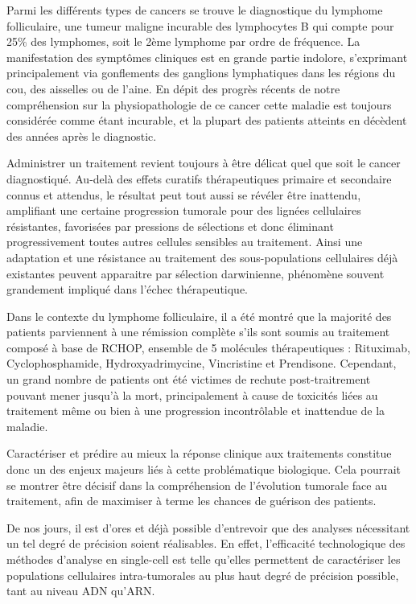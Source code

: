 \documentclass[12pt]{report}
\begin{document}
Parmi les différents types de cancers se trouve le diagnostique du lymphome folliculaire, une tumeur maligne incurable des lymphocytes B qui compte pour 25\% des lymphomes, soit le 2ème lymphome par ordre de fréquence. 
La manifestation des symptômes cliniques est en grande partie indolore, s'exprimant principalement via gonflements des ganglions lymphatiques dans les régions du cou, des aisselles ou de l’aine. 
En dépit des progrès récents de notre compréhension sur la physiopathologie de ce cancer\cite{huet} cette maladie est toujours considérée comme étant incurable, et la plupart des patients atteints en décèdent des années après le diagnostic. 

Administrer un traitement revient toujours à être délicat quel que soit le cancer diagnostiqué. 
Au-delà des effets curatifs thérapeutiques primaire et secondaire connus et attendus, le résultat peut tout aussi se révéler être inattendu, amplifiant une certaine progression tumorale pour des lignées cellulaires résistantes,
favorisées par pressions de sélections et donc éliminant progressivement toutes autres cellules sensibles au traitement\cite{Greaves}. 
Ainsi une adaptation et une résistance au traitement des sous-populations cellulaires déjà existantes peuvent apparaitre par sélection darwinienne, phénomène souvent grandement impliqué dans l’échec thérapeutique. 

Dans le contexte du lymphome folliculaire, il a été montré que la majorité des patients parviennent à une rémission complète s'ils sont soumis au traitement composé à base de RCHOP, 
ensemble de 5 molécules thérapeutiques : Rituximab, Cyclophosphamide, Hydroxyadrimycine, Vincristine et Prendisone\cite{Salles}. 
Cependant, un grand nombre de patients ont été victimes de rechute post-traitrement pouvant mener jusqu'à la mort, principalement à cause de toxicités liées au traitement même ou bien à une progression incontrôlable et inattendue de la maladie\cite{Hiddemann}.

Caractériser et prédire au mieux la réponse clinique aux traitements constitue donc un des enjeux majeurs liés à cette problématique biologique. 
Cela pourrait se montrer être décisif dans la compréhension de l'évolution tumorale face au traitement, afin de maximiser à terme les chances de guérison des patients.

De nos jours, il est d’ores et déjà possible d'entrevoir que des analyses nécessitant un tel degré de précision soient réalisables. 
En effet, l’efficacité technologique des méthodes d’analyse en single-cell est telle qu’elles permettent de caractériser les populations cellulaires intra-tumorales au plus haut degré de précision possible, tant au niveau ADN qu’ARN. 
\end{document}
